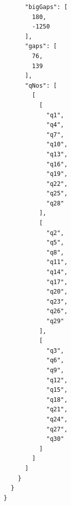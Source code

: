 \documentclass[a4paper, 12pt]{book}
\begin{document}
{\begin{verbatim}
        "bigGaps": [
          180,
          -1250
        ],
        "gaps": [
          76,
          139
        ],
        "qNos": [
          [
            [
              "q1",
              "q4",
              "q7",
              "q10",
              "q13",
              "q16",
              "q19",
              "q22",
              "q25",
              "q28"
            ],
            [
              "q2",
              "q5",
              "q8",
              "q11",
              "q14",
              "q17",
              "q20",
              "q23",
              "q26",
              "q29"
            ],
            [
              "q3",
              "q6",
              "q9",
              "q12",
              "q15",
              "q18",
              "q21",
              "q24",
              "q27",
              "q30"
            ]
          ]
        ]
      }
    }
  }
\end{verbatim}
}


\cleardoublepage


\end{document}
